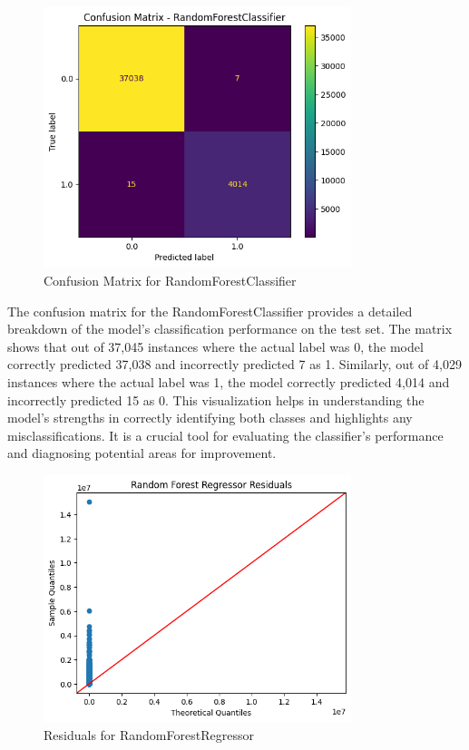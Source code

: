 \documentclass{article}
\begin{document}
\begin{figure}[H]
    \centering
    \includegraphics[width=0.8\textwidth]{images/confusion_matrix.png} %
    \caption{Confusion Matrix for RandomForestClassifier}
    \label{fig:confusion_matrix}
\end{figure}

The confusion matrix for the RandomForestClassifier provides a detailed breakdown of the model's classification performance on the test set. The matrix shows that out of 37,045 instances where the actual label was 0, the model correctly predicted 37,038 and incorrectly predicted 7 as 1. Similarly, out of 4,029 instances where the actual label was 1, the model correctly predicted 4,014 and incorrectly predicted 15 as 0. This visualization helps in understanding the model's strengths in correctly identifying both classes and highlights any misclassifications. It is a crucial tool for evaluating the classifier's performance and diagnosing potential areas for improvement.

\begin{figure}[H]
    \centering
    \includegraphics[width=0.8\textwidth]{images/residuals.png} %
    \caption{Residuals for RandomForestRegressor}
    \label{fig:residuals}
\end{figure}
\end{document}
